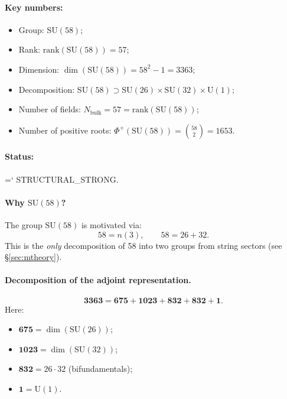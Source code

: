 \documentclass[11pt,a4paper]{article}
\newcommand{\SU}{\mathrm{SU}}
\newcommand{\Nbulk}{N_{\text{bulk}}}
\renewcommand{\texttt}[1]{{\ttfamily\hyphenchar\font=`\- #1}}
\theoremstyle{definition}
\begin{document}
\paragraph{Key numbers:}
\begin{itemize}
    \item Group: $\SU(58)$;
    \item Rank: $\mathrm{rank}(\SU(58)) = 57$;
    \item Dimension: $\dim(\SU(58)) = 58^2 - 1 = 3363$;
    \item Decomposition: 
          $\SU(58) \supset \SU(26) \times \SU(32) \times \mathrm{U}(1)$;
    \item Number of fields: $\Nbulk = 57 = \mathrm{rank}(\SU(58))$;
    \item Number of positive roots: 
          $\Phi^+(\SU(58)) = \binom{58}{2} = 1653$.
\end{itemize}

\paragraph{Status:} \texttt{STRUCTURAL\_STRONG}.

\paragraph{Why $\SU(58)$?}
The group $\SU(58)$ is motivated via:
\begin{equation}
    58 = n(3), \qquad 58 = 26 + 32.
\end{equation}
This is the \emph{only} decomposition of 58 into two groups from 
string sectors (see §\ref{sec:mtheory}).

\paragraph{Decomposition of the adjoint representation.}
\begin{equation}
    \mathbf{3363} = \mathbf{675} + \mathbf{1023} 
    + \mathbf{832} + \mathbf{832} + \mathbf{1}.
\end{equation}
Here:
\begin{itemize}
    \item $\mathbf{675} = \dim(\SU(26))$;
    \item $\mathbf{1023} = \dim(\SU(32))$;
    \item $\mathbf{832} = 26 \cdot 32$ (bifundamentals);
    \item $\mathbf{1} = \mathrm{U}(1)$.
\end{itemize}
\end{document}

